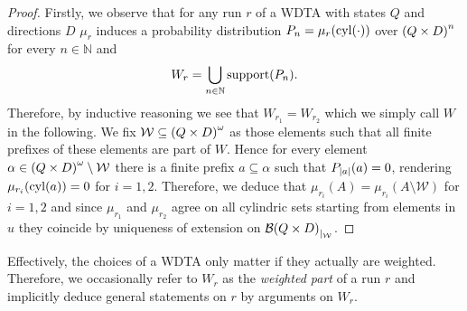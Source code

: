\begin{proof}
  Firstly, we observe that for any run $r$ of a \ac{WDTA} with states $Q$ and
  directions $D$ $\mu_{r}$ induces a probability distribution 
  $P_{n} = \mu_{r}(\operatorname{cyl}(\cdot))$ over $\left(Q\times D\right)^{n}$ for every 
  $n\in\mathbb{N}$ and
  \begin{equation*}
    W_{r} = \bigcup_{n\in\mathbb{N}}\operatorname{support}(P_{n}).
  \end{equation*}
  Therefore, by inductive reasoning we see that $W_{r_{1}} = W_{r_{2}}$ which
  we simply call $W$ in the following. We fix
  $\mathcal{W}\subseteq\left(Q\times D\right)^{\omega}$ as those elements such that
  all finite prefixes of these elements are part of $W$. Hence for every 
  element $\alpha\in \left(Q\times D\right)^{\omega}\setminus\mathcal{W}$ there is
  a finite prefix $a\subseteq\alpha$ such that $P_{\left\vert{a}\right\vert}(a) = 0$, rendering
  $\mu_{r_{i}}(\operatorname{cyl}(a)) = 0$ for $i = 1,2$. Therefore, we deduce that
  $\mu_{r_{i}}(A) = \mu_{r_{i}}(A\setminus\mathcal{W})$ for $i = 1,2$ and since
  $\mu_{r_{1}}$ and $\mu_{r_{2}}$ agree on all cylindric sets starting from 
  elements in $u$ they coincide by uniqueness of extension on
  ${\mathcal{B}(Q\times D)}_{|_{\mathcal{W}}}$.
\end{proof}
Effectively, the choices of a \ac{WDTA} only matter if they actually are 
weighted. Therefore, we occasionally refer to $W_{r}$ as the 
\emph{weighted part} of a run $r$ and implicitly deduce general statements on
$r$ by arguments on $W_{r}$.

